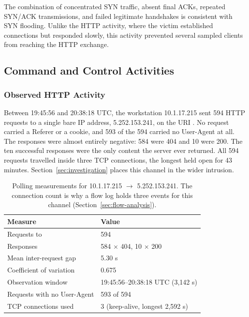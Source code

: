 The combination of concentrated SYN traffic, absent final ACKs, repeated SYN/ACK transmissions, and failed legitimate handshakes is consistent with SYN flooding. Unlike the HTTP activity, where the victim established connections but responded slowly, this activity prevented several sampled clients from reaching the HTTP exchange.

\subsection{Command and Control Activities}
\label{sec:c2}

\subsubsection{Observed HTTP Activity}

Between 19:45:56 and 20:38:18 UTC, the workstation 10.1.17.215 sent 594 HTTP requests to a single bare IP address, 5.252.153.241, on the URI . No request carried a Referer or a cookie, and 593 of the 594 carried no User-Agent at all. The responses were almost entirely negative: 584 were 404 and 10 were 200. The ten successful responses were the only content the server ever returned. All 594 requests travelled inside three TCP connections, the longest held open for 43 minutes. Section~\ref{sec:investigation} places this channel in the wider intrusion.

\begin{table}[htbp]
  \centering
  \caption{Polling measurements for 10.1.17.215 $\rightarrow$ 5.252.153.241. The connection count is why a flow log holds three events for this channel (Section~\ref{sec:flow-analysis}).}
  \label{tab:poll-measurements}
  \begin{tabularx}{\linewidth}{@{}YY@{}}
    \toprule
    \textbf{Measure} & \textbf{Value} \\
    \midrule
    Requests to  & 594 \\
    Responses & 584 $\times$ 404, 10 $\times$ 200 \\
    Mean inter-request gap & 5.30 s \\
    Coefficient of variation & 0.675 \\
    Observation window & 19:45:56--20:38:18 UTC (3,142 s) \\
    Requests with no User-Agent & 593 of 594 \\
    TCP connections used & 3 (keep-alive, longest 2,592 s) \\
    \bottomrule
  \end{tabularx}
\end{table}

